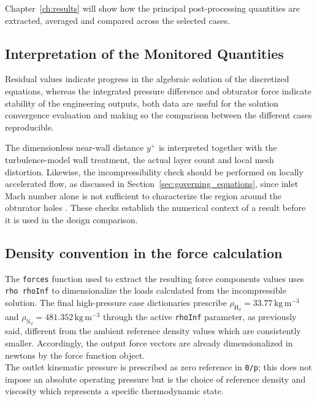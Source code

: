 Chapter~\ref{ch:results} will show how the principal post-processing quantities are extracted, averaged and compared across the selected cases.


\subsection{Interpretation of the Monitored Quantities}

Residual values indicate progress in the algebraic solution of the discretized equations, whereas the integrated pressure difference and obturator force indicate stability of the engineering outputs, both data are useful for the solution convergence evaluation and making so the comparison between the different cases reproducible. 

The dimensionless near-wall distance $y^+$ is interpreted together with the turbulence-model wall treatment, the actual layer count and local mesh distortion. Likewise, the incompressibility check should be performed on locally accelerated flow, as discussed in Section~\ref{sec:governing_equations}, since inlet Mach number alone is not sufficient to characterize the region around the obturator holes \cite{anderson2017}. These checks establish the numerical context of a result before it is used in the design comparison.

\subsection{Density convention in the force calculation}
The \texttt{forces} function used to extract the resulting force components values uses \texttt{rho rhoInf} to dimensionalize the loads calculated from the incompressible solution. The final high-pressure case dictionaries prescribe $\rho_{\mathrm{H}_2}=33.77\,\mathrm{kg\,m^{-3}}$ and $\rho_{\mathrm{N}_2}=481.352\,\mathrm{kg\,m^{-3}}$ through the active \texttt{rhoInf} parameter, as previously said, different from the ambient reference density values which are consistently smaller. Accordingly, the output force vectors are already dimensionalized in newtons by the force function object.\\

The outlet kinematic pressure is prescribed as zero reference in \texttt{0/p}; this does not impose an absolute operating pressure but is the choice of reference density and viscosity which represents a specific thermodynamic state.

